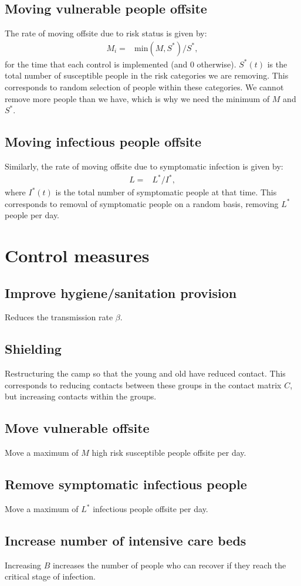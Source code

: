 \subsection{Moving vulnerable people offsite}
The rate of moving offsite due to risk status is given by:
\begin{align}
    M_i ={}& \mathrm{min}(M,S^*)/S^*,
\end{align}
for the time that each control is implemented (and 0 otherwise). $S^*(t)$ is the total number of susceptible people in the risk categories we are removing. This corresponds to random selection of people within these categories. We cannot remove more people than we have, which is why we need the minimum of $M$ and $S^*$.

\subsection{Moving infectious people offsite}
Similarly, the rate of moving offsite due to symptomatic infection is given by:
\begin{align}
    L ={}& L^*/I^*,
\end{align}
where $I^*(t)$ is the total number of symptomatic people at that time. This corresponds to removal of symptomatic people on a random basis, removing $L^*$ people per day.

\section{Control measures}

\subsection{Improve hygiene/sanitation provision}
Reduces the transmission rate $\beta$.

\subsection{Shielding}
Restructuring the camp so that the young and old have reduced contact. This corresponds to reducing contacts between these groups in the contact matrix $C$, but increasing contacts within the groups.

\subsection{Move vulnerable offsite}
Move a maximum of $M$ high risk susceptible people offsite per day.

\subsection{Remove symptomatic infectious people}
Move a maximum of $L^*$ infectious people offsite per day.

\subsection{Increase number of intensive care beds}
Increasing $B$ increases the number of people who can recover if they reach the critical stage of infection.




